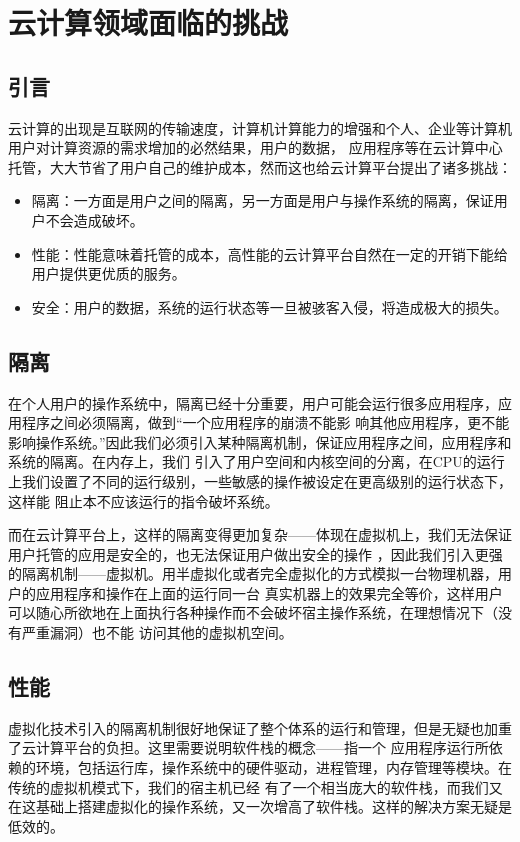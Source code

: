 \chapter{云计算领域面临的挑战}
\thispagestyle{empty}

\section{引言}
云计算的出现是互联网的传输速度，计算机计算能力的增强和个人、企业等计算机用户对计算资源的需求增加的必然结果，用户的数据，
应用程序等在云计算中心托管，大大节省了用户自己的维护成本，然而这也给云计算平台提出了诸多挑战：
\begin{itemize}
    \item 隔离：一方面是用户之间的隔离，另一方面是用户与操作系统的隔离，保证用户不会造成破坏。
    \item 性能：性能意味着托管的成本，高性能的云计算平台自然在一定的开销下能给用户提供更优质的服务。
    \item 安全：用户的数据，系统的运行状态等一旦被骇客入侵，将造成极大的损失。
\end{itemize}

\section{隔离}
在个人用户的操作系统中，隔离已经十分重要，用户可能会运行很多应用程序，应用程序之间必须隔离，做到“一个应用程序的崩溃不能影
响其他应用程序，更不能影响操作系统。”因此我们必须引入某种隔离机制，保证应用程序之间，应用程序和系统的隔离。在内存上，我们
引入了用户空间和内核空间的分离，在CPU的运行上我们设置了不同的运行级别，一些敏感的操作被设定在更高级别的运行状态下，这样能
阻止本不应该运行的指令破坏系统。

而在云计算平台上，这样的隔离变得更加复杂——体现在虚拟机上，我们无法保证用户托管的应用是安全的，也无法保证用户做出安全的操作
，因此我们引入更强的隔离机制——虚拟机。用半虚拟化或者完全虚拟化的方式模拟一台物理机器，用户的应用程序和操作在上面的运行同一台
真实机器上的效果完全等价，这样用户可以随心所欲地在上面执行各种操作而不会破坏宿主操作系统，在理想情况下（没有严重漏洞）也不能
访问其他的虚拟机空间。

\section{性能}
虚拟化技术引入的隔离机制很好地保证了整个体系的运行和管理，但是无疑也加重了云计算平台的负担。这里需要说明软件栈的概念——指一个
应用程序运行所依赖的环境，包括运行库，操作系统中的硬件驱动，进程管理，内存管理等模块。在传统的虚拟机模式下，我们的宿主机已经
有了一个相当庞大的软件栈，而我们又在这基础上搭建虚拟化的操作系统，又一次增高了软件栈。这样的解决方案无疑是低效的。


